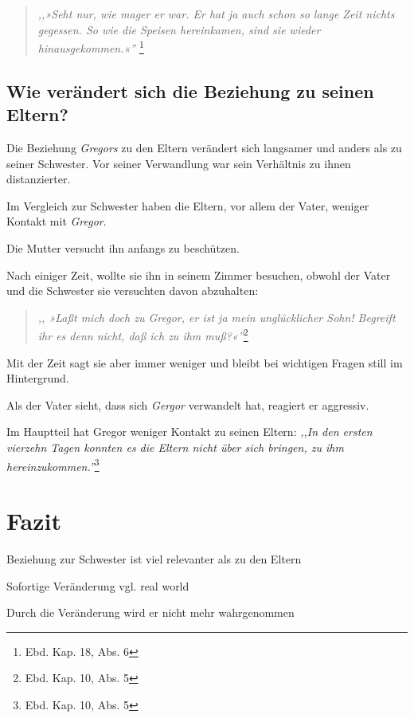 \documentclass[12pt,a4paper,twoside,titlepage]{article}
\let\oldsection\section
\renewcommand\section{\clearpage\oldsection}
\begin{document}
	\begin{quote}
		\textit{,,»Seht nur, wie mager er war. Er hat ja auch schon so lange Zeit nichts gegessen. So wie die Speisen hereinkamen, sind sie wieder hinausgekommen.«''} \footnote{Ebd. Kap. 18, Abs. 6}
	\end{quote}
	
	
	
	\subsection{Wie verändert sich die Beziehung zu seinen Eltern?}

	Die Beziehung \textit{Gregors} zu den Eltern verändert sich langsamer und anders als zu seiner Schwester. Vor seiner Verwandlung war sein Verhältnis zu ihnen distanzierter.
	
	Im Vergleich zur Schwester haben die Eltern, vor allem der Vater, weniger Kontakt mit \textit{Gregor}.
	
	Die Mutter versucht ihn anfangs zu beschützen.
	
	Nach einiger Zeit, wollte sie ihn in seinem Zimmer besuchen, obwohl der Vater und die Schwester sie versuchten davon abzuhalten: 

	\begin{quote}
		\textit{,, »Laßt mich doch zu Gregor, er ist ja mein unglücklicher Sohn! Begreift ihr es denn nicht, daß ich zu ihm muß?«''}\footnote{Ebd. Kap. 10, Abs. 5}
	\end{quote}
	
	Mit der Zeit sagt sie aber immer weniger und bleibt bei wichtigen Fragen still im Hintergrund.
	
	Als der Vater sieht, dass sich \textit{Gergor} verwandelt hat, reagiert er aggressiv. 
	
	
	
	Im Hauptteil hat Gregor weniger Kontakt zu seinen Eltern: \textit{,,In den ersten vierzehn Tagen konnten es die Eltern nicht über sich bringen, zu ihm hereinzukommen.''}\footnote{Ebd. Kap. 10, Abs. 5}
	
	\section{Fazit}
	
	Beziehung zur Schwester ist viel relevanter als zu den Eltern
	
	Sofortige Veränderung vgl. real world
	
	Durch die Veränderung wird er nicht mehr wahrgenommen 
	
\end{document}
